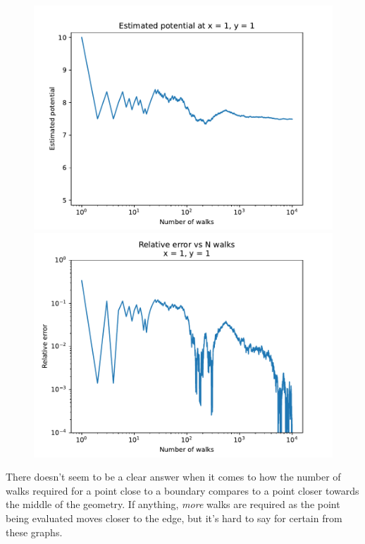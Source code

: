 \documentclass[a4paper,12pt]{article}
\begin{document}
\begin{figure}[!ht]
  \centering
  \begin{minipage}{0.49\textwidth}
    \includegraphics[width=\textwidth]{img/4_3b_2_V11.pdf}
  \end{minipage}
  \begin{minipage}{0.49\textwidth}
    \includegraphics[width=\textwidth]{img/4_3b_2_E11.pdf}
  \end{minipage}
\end{figure}

There doesn't seem to be a clear answer when it comes to how the number of walks required for a point close to a
boundary compares to a point closer towards the middle of the geometry. If anything, \emph{more} walks are required
as the point being evaluated moves closer to the edge, but it's hard to say for certain from these graphs.
\end{document}
